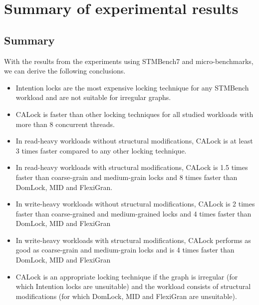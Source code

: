 \section{Summary of experimental results}


\subsection{Summary}
With the results from the experiments using STMBench7 and micro-benchmarks, we can derive the following conclusions.
\begin{itemize}
	\item Intention locks are the most expensive locking technique for any STMBench workload and are not suitable for irregular graphs.
	\item CALock is faster than other locking techniques for all studied workloads with more than 8 concurrent threads.

	\item In read-heavy workloads without structural modifications, CALock is at least 3 times faster compared to any other locking technique.

	\item  In read-heavy workloads with structural modifications, CALock is 1.5 times faster than coarse-grain and medium-grain locks and 8 times faster than DomLock, MID and FlexiGran.

	\item In write-heavy workloads without structural modifications, CALock is 2 times faster than coarse-grained and medium-grained locks and 4 times faster than DomLock, MID and FlexiGran

	\item In write-heavy workloads with structural modifications, CALock performs as good as coarse-grain and medium-grain locks and is 4 times faster than DomLock, MID and FlexiGran

	\item CALock is an appropriate locking technique if the graph is irregular (for which Intention locks are unsuitable) and the workload consists of structural modifications (for which DomLock, MID and FlexiGran are unsuitable).
\end{itemize}
